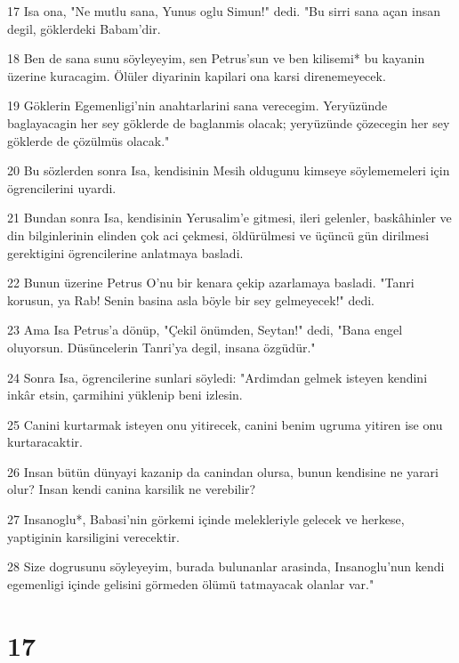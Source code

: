 \par 17 Isa ona, "Ne mutlu sana, Yunus oglu Simun!" dedi. "Bu sirri sana açan insan degil, göklerdeki Babam'dir.
\par 18 Ben de sana sunu söyleyeyim, sen Petrus'sun ve ben kilisemi* bu kayanin üzerine kuracagim. Ölüler diyarinin kapilari ona karsi direnemeyecek.
\par 19 Göklerin Egemenligi'nin anahtarlarini sana verecegim. Yeryüzünde baglayacagin her sey göklerde de baglanmis olacak; yeryüzünde çözecegin her sey göklerde de çözülmüs olacak."
\par 20 Bu sözlerden sonra Isa, kendisinin Mesih oldugunu kimseye söylememeleri için ögrencilerini uyardi.
\par 21 Bundan sonra Isa, kendisinin Yerusalim'e gitmesi, ileri gelenler, baskâhinler ve din bilginlerinin elinden çok aci çekmesi, öldürülmesi ve üçüncü gün dirilmesi gerektigini ögrencilerine anlatmaya basladi.
\par 22 Bunun üzerine Petrus O'nu bir kenara çekip azarlamaya basladi. "Tanri korusun, ya Rab! Senin basina asla böyle bir sey gelmeyecek!" dedi.
\par 23 Ama Isa Petrus'a dönüp, "Çekil önümden, Seytan!" dedi, "Bana engel oluyorsun. Düsüncelerin Tanri'ya degil, insana özgüdür."
\par 24 Sonra Isa, ögrencilerine sunlari söyledi: "Ardimdan gelmek isteyen kendini inkâr etsin, çarmihini yüklenip beni izlesin.
\par 25 Canini kurtarmak isteyen onu yitirecek, canini benim ugruma yitiren ise onu kurtaracaktir.
\par 26 Insan bütün dünyayi kazanip da canindan olursa, bunun kendisine ne yarari olur? Insan kendi canina karsilik ne verebilir?
\par 27 Insanoglu*, Babasi'nin görkemi içinde melekleriyle gelecek ve herkese, yaptiginin karsiligini verecektir.
\par 28 Size dogrusunu söyleyeyim, burada bulunanlar arasinda, Insanoglu'nun kendi egemenligi içinde gelisini görmeden ölümü tatmayacak olanlar var."

\chapter{17}

